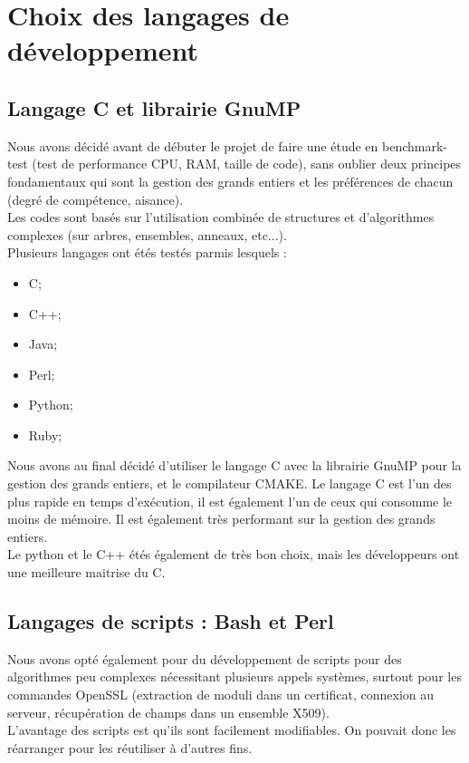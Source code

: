 \section{Choix des langages de développement}

\subsection{Langage C et librairie GnuMP}

Nous avons décidé avant de débuter le projet de faire une étude en benchmark-test \cite{chooseprogram2013} \cite{marceau2009program} \cite{udemypng} (test de performance CPU, RAM, taille de code), sans oublier deux principes fondamentaux qui sont la gestion des grands entiers et les préférences de chacun (degré de compétence, aisance).\\
Les codes sont basés sur l'utilisation combinée de structures et d'algorithmes complexes (sur arbres, ensembles, anneaux, etc...).\\

Plusieurs langages ont étés testés parmis lesquels :
\begin{itemize}
\item C;
\item C++;
\item Java;
\item Perl;
\item Python;
\item Ruby;\\
\end{itemize}

Nous avons au final décidé d'utiliser le langage C avec la librairie GnuMP \cite{gmplib} pour la gestion des grands entiers, et le compilateur CMAKE.
Le langage C est l'un des plus rapide en temps d'exécution, il est également l'un de ceux qui consomme le moins de mémoire. Il est également très performant sur la gestion des grands entiers.\\
Le python et le C++ étés également de très bon choix, mais les développeurs ont une meilleure maitrise du C.

\subsection{Langages de scripts : Bash et Perl}

Nous avons opté également pour du développement de scripts pour des algorithmes peu complexes nécessitant plusieurs appels systèmes, surtout pour les commandes OpenSSL (extraction de moduli dans un certificat, connexion au serveur, récupération de champs dans un ensemble X509).\\
L'avantage des scripts est qu'ils sont facilement modifiables. On pouvait donc les réarranger pour les réutiliser à d'autres fins.

